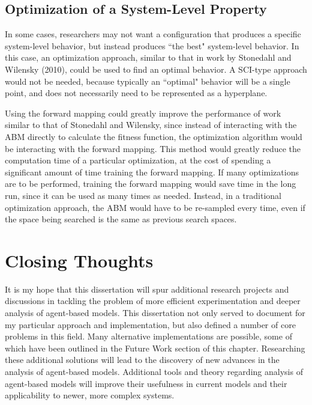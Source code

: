 \subsection{Optimization of a System-Level Property}

In some cases, researchers may not want a configuration that produces a specific system-level behavior, but instead produces ``the best" system-level behavior.
In this case, an optimization approach, similar to that in work by Stonedahl and Wilensky (2010)\nocite{stonedahl}, could be used to find an optimal behavior.
A SCI-type approach would not be needed, because typically an ``optimal" behavior will be a single point, and does not necessarily need to be represented as a hyperplane.

Using the forward mapping could greatly improve the performance of work similar to that of Stonedahl and Wilensky, since instead of interacting with the ABM directly to calculate the fitness function, the optimization algorithm would be interacting with the forward mapping.
This method would greatly reduce the computation time of a particular optimization, at the cost of spending a significant amount of time training the forward mapping.
If many optimizations are to be performed, training the forward mapping would save time in the long run, since it can be used as many times as needed.
Instead, in a traditional optimization approach, the ABM would have to be re-sampled every time, even if the space being searched is the same as previous search spaces.


\section{Closing Thoughts}

It is my hope that this dissertation will spur additional research projects and discussions in tackling the problem of more efficient experimentation and deeper analysis of agent-based models.
This dissertation not only served to document for my particular approach and implementation, but also defined a number of core problems in this field.
Many alternative implementations are possible, some of which have been outlined in the Future Work section of this chapter.
Researching these additional solutions  will  lead to the discovery of new advances in the analysis of agent-based models.
Additional tools and theory regarding analysis of agent-based models will improve their usefulness in current models and their applicability to newer, more complex systems.


